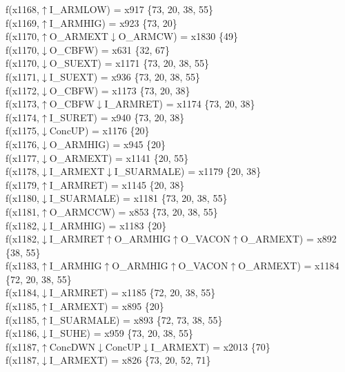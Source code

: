 f(x1168,$\uparrow$I\_ARMLOW) = x917 \{73, 20, 38, 55\} \\  
f(x1169,$\uparrow$I\_ARMHIG) = x923 \{73, 20\} \\  
f(x1170,$\uparrow$O\_ARMEXT$\downarrow$O\_ARMCW) = x1830 \{49\} \\  
f(x1170,$\downarrow$O\_CBFW) = x631 \{32, 67\} \\  
f(x1170,$\downarrow$O\_SUEXT) = x1171 \{73, 20, 38, 55\} \\  
f(x1171,$\downarrow$I\_SUEXT) = x936 \{73, 20, 38, 55\} \\  
f(x1172,$\downarrow$O\_CBFW) = x1173 \{73, 20, 38\} \\  
f(x1173,$\uparrow$O\_CBFW$\downarrow$I\_ARMRET) = x1174 \{73, 20, 38\} \\  
f(x1174,$\uparrow$I\_SURET) = x940 \{73, 20, 38\} \\  
f(x1175,$\downarrow$ConcUP) = x1176 \{20\} \\  
f(x1176,$\downarrow$O\_ARMHIG) = x945 \{20\} \\  
f(x1177,$\downarrow$O\_ARMEXT) = x1141 \{20, 55\} \\  
f(x1178,$\downarrow$I\_ARMEXT$\downarrow$I\_SUARMALE) = x1179 \{20, 38\} \\  
f(x1179,$\uparrow$I\_ARMRET) = x1145 \{20, 38\} \\  
f(x1180,$\downarrow$I\_SUARMALE) = x1181 \{73, 20, 38, 55\} \\  
f(x1181,$\uparrow$O\_ARMCCW) = x853 \{73, 20, 38, 55\} \\  
f(x1182,$\downarrow$I\_ARMHIG) = x1183 \{20\} \\  
f(x1182,$\downarrow$I\_ARMRET$\uparrow$O\_ARMHIG$\uparrow$O\_VACON$\uparrow$O\_ARMEXT) = x892 \{38, 55\} \\  
f(x1183,$\uparrow$I\_ARMHIG$\uparrow$O\_ARMHIG$\uparrow$O\_VACON$\uparrow$O\_ARMEXT) = x1184 \{72, 20, 38, 55\} \\  
f(x1184,$\downarrow$I\_ARMRET) = x1185 \{72, 20, 38, 55\} \\  
f(x1185,$\uparrow$I\_ARMEXT) = x895 \{20\} \\  
f(x1185,$\uparrow$I\_SUARMALE) = x893 \{72, 73, 38, 55\} \\  
f(x1186,$\downarrow$I\_SUHE) = x959 \{73, 20, 38, 55\} \\  
f(x1187,$\uparrow$ConcDWN$\downarrow$ConcUP$\downarrow$I\_ARMEXT) = x2013 \{70\} \\  
f(x1187,$\downarrow$I\_ARMEXT) = x826 \{73, 20, 52, 71\} \\  
